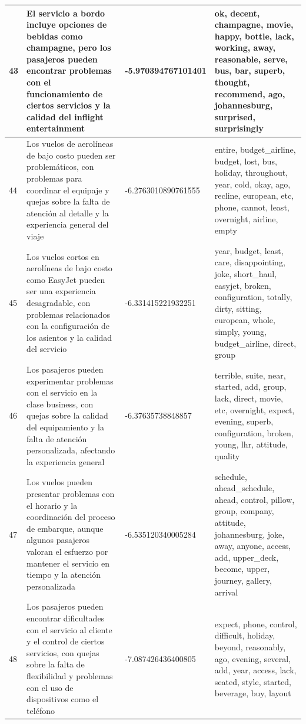 \documentclass{report}
\begin{document}
{{\begin{longtable}{|p{1cm}|p{4cm}|p{4cm}|p{6cm}|}
                    \hline
                    43 & El servicio a bordo incluye opciones de bebidas como champagne, pero los pasajeros pueden encontrar problemas con el funcionamiento de ciertos servicios y la calidad del inflight entertainment & -5.970394767101401 & ok, decent, champagne, movie, happy, bottle, lack, working, away, reasonable, serve, bus, bar, superb, thought, recommend, ago, johannesburg, surprised, surprisingly \\
                    \hline
                    44 & Los vuelos de aerolíneas de bajo costo pueden ser problemáticos, con problemas para coordinar el equipaje y quejas sobre la falta de atención al detalle y la experiencia general del viaje & -6.2763010890761555 & entire, budget\_airline, budget, lost, bus, holiday, throughout, year, cold, okay, ago, recline, european, etc, phone, cannot, least, overnight, airline, empty \\
                    \hline
                    45 & Los vuelos cortos en aerolíneas de bajo costo como EasyJet pueden ser una experiencia desagradable, con problemas relacionados con la configuración de los asientos y la calidad del servicio & -6.331415221932251 & year, budget, least, care, disappointing, joke, short\_haul, easyjet, broken, configuration, totally, dirty, sitting, european, whole, simply, young, budget\_airline, direct, group \\
                    \hline
                    46 & Los pasajeros pueden experimentar problemas con el servicio en la clase business, con quejas sobre la calidad del equipamiento y la falta de atención personalizada, afectando la experiencia general & -6.37635738848857 & terrible, suite, near, started, add, group, lack, direct, movie, etc, overnight, expect, evening, superb, configuration, broken, young, lhr, attitude, quality \\
                    \hline
                    47 & Los vuelos pueden presentar problemas con el horario y la coordinación del proceso de embarque, aunque algunos pasajeros valoran el esfuerzo por mantener el servicio en tiempo y la atención personalizada & -6.535120340005284 & schedule, ahead\_schedule, ahead, control, pillow, group, company, attitude, johannesburg, joke, away, anyone, access, add, upper\_deck, become, upper, journey, gallery, arrival \\
                    \hline
                    48 & Los pasajeros pueden encontrar dificultades con el servicio al cliente y el control de ciertos servicios, con quejas sobre la falta de flexibilidad y problemas con el uso de dispositivos como el teléfono & -7.087426436400805 & expect, phone, control, difficult, holiday, beyond, reasonably, ago, evening, several, add, year, access, lack, seated, style, started, beverage, buy, layout \\

\end{longtable}}}
\end{document}
